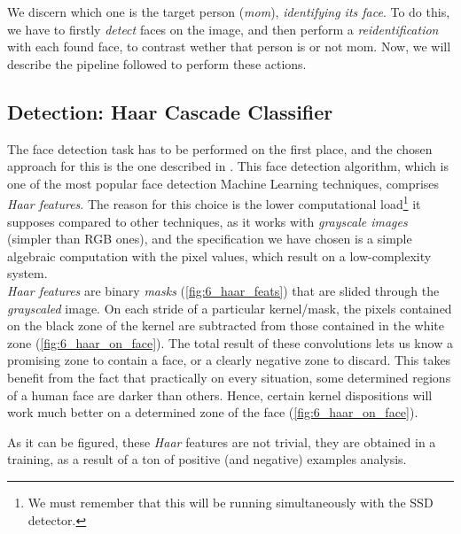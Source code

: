 	We discern which one is the target person (\emph{mom}), \emph{identifying its face}. To do this, we have to firstly \emph{detect} faces on the image, and then perform a \emph{reidentification} with each found face, to contrast wether that person is or not mom. Now, we will describe the pipeline followed to perform these actions.
	
	\subsection{Detection: Haar Cascade Classifier}
	
		The face detection task has to be performed on the first place, and the chosen approach for this is the one described in \cite{cawadallah}. This face detection algorithm, which is one of the most popular face detection Machine Learning techniques, comprises \emph{Haar features}. The reason for this choice is the lower computational load\footnote{We must remember that this will be running simultaneously with the SSD detector.} it supposes compared to other techniques, as it works with \emph{grayscale images} (simpler than RGB ones), and the specification we have chosen is a simple algebraic computation with the pixel values, which result on a low-complexity system.\\
		
		\emph{Haar features} are binary \emph{masks} (\autoref{fig:6_haar_feats}) that are slided through the \emph{grayscaled} image. On each stride of a particular kernel/mask, the pixels contained on the black zone of the kernel are subtracted from those contained in the white zone (\autoref{fig:6_haar_on_face}). The total result of these convolutions lets us know a promising zone to contain a face, or a clearly negative zone to discard. This takes benefit from the fact that practically on every situation, some determined regions of a human face are darker than others. Hence, certain kernel dispositions will work much better on a determined zone of the face (\autoref{fig:6_haar_on_face}).
		
		As it can be figured, these \emph{Haar} features are not trivial, they are obtained in a training, as a result of a ton of positive (and negative) examples analysis.\\
	
